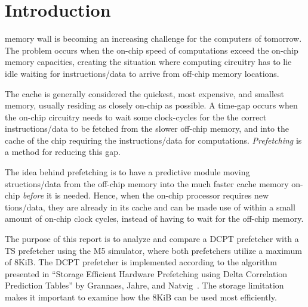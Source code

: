\section{Introduction}

 memory wall is becoming an increasing challenge for the
computers of tomorrow. The problem occurs when the on-chip speed of computations
exceed the on-chip memory capacities, creating the situation where computing
circuitry has to lie idle waiting for instructions/data to arrive from off-chip
memory locations. 

The cache is generally considered the quickest, most expensive, and smallest memory, usually residing as closely on-chip as possible. A time-gap occurs when the on-chip circuitry needs to wait some clock-cycles for the the correct instructions/data to be fetched from the slower off-chip memory, and into the cache of the chip requiring the instructions/data for computations. \emph{Prefetching} is a method for reducing this gap.

The idea behind prefetching is to have a predictive module moving structions/data from the off-chip memory into the much faster cache memory on-chip \emph{before} it is needed. Hence, when the on-chip processor requires new tions/data, they are already in its cache and can be made use of within a small amount of on-chip clock cycles, instead of having to wait for the off-chip memory.

The purpose of this report is to analyze and compare a DCPT prefetcher with a TS
prefetcher using the M5 simulator, where both prefetchers utilize a maximum of
8KiB. The DCPT prefetcher is implemented according to the algorithm presented in
``Storage Efficient Hardware Prefetching using Delta Correlation Prediction
Tables'' by Grannaes, Jahre, and Natvig~\cite{dcpt}. The storage limitation
makes it important to examine how the 8KiB can be used most efficiently.



